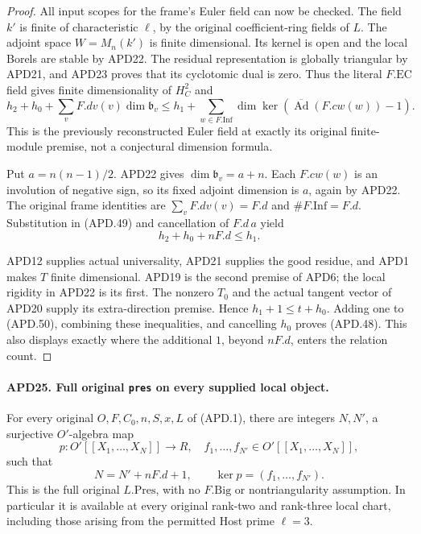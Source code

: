 \documentclass[11pt,a4paper]{article}
\numberwithin{equation}{section}
\theoremstyle{remark}\newtheorem{remark}[theorem]{Remark}
\begin{document}
\begin{proof}
All input scopes for the frame's Euler field can now be checked.
The field \(k'\) is finite of characteristic \(\ell\), by
the original coefficient-ring fields of \(L\).  The adjoint
space \(W=M_n(k')\) is finite dimensional.  Its kernel is
open and the local Borels are stable by APD22.  The residual
representation is globally triangular by APD21, and APD23
proves that its cyclotomic dual is zero.  Thus the literal
\(F.\mathrm{EC}\) field gives finite dimensionality of
\(H_C^2\) and
\[
 h_2+h_0+\sum_v F.dv(v)\dim\mathfrak b_v
        \le h_1+\sum_{w\in F.\mathrm{Inf}}
             \dim\ker(\overline{\operatorname{Ad}}(F.cw(w))-1).
                                                               \tag{APD.49}
\]
This is the previously reconstructed Euler field at exactly its
original finite-module premise, not a conjectural dimension formula.

Put \(a=n(n-1)/2\).  APD22 gives
\(\dim\mathfrak b_v=a+n\).  Each \(F.cw(w)\) is an
involution of negative sign, so its fixed adjoint dimension is
\(a\), again by APD22.  The original frame identities are
\(\sum_v F.dv(v)=F.d\) and
\(\#F.\mathrm{Inf}=F.d\).  Substitution in (APD.49)
and cancellation of \(F.d\,a\) yield
\[
                         h_2+h_0+nF.d\le h_1.             \tag{APD.50}
\]

APD12 supplies actual universality, APD21 supplies the good
residue, and APD1 makes \(T\) finite dimensional.  APD19
is the second premise of APD6; the local rigidity in APD22
is its first.  The nonzero \(T_0\) and the actual tangent
vector of APD20 supply its extra-direction premise.  Hence
\(h_1+1\le t+h_0\).  Adding one to (APD.50), combining
these inequalities, and cancelling \(h_0\) proves (APD.48).
This also displays exactly where the additional \(1\), beyond
\(nF.d\), enters the relation count.
\end{proof}

\paragraph{APD25. Full original \texttt{pres} on every supplied local object.}
\label{claim:APD25}
For every original \(O,F,C_0,n,S,x,L\) of (APD.1), there
are integers \(N,N'\), a surjective \(O'\)-algebra map
\[
 p:O'[[X_1,\ldots,X_N]]\longrightarrow R,
 \quad f_1,\ldots,f_{N'}\in O'[[X_1,\ldots,X_N]],
\]
such that
\[
            N=N'+nF.d+1,\qquad \ker p=(f_1,\ldots,f_{N'}).
                                                               \tag{APD.51}
\]
This is the full original \(L.\mathrm{Pres}\), with no
\(F.\mathrm{Big}\) or nontriangularity assumption.  In particular
it is available at every original rank-two and rank-three local
chart, including those arising from the permitted Host prime
\(\ell=3\).
\end{document}
